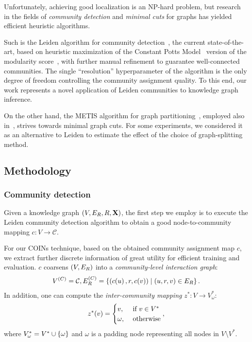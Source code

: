 Unfortunately, achieving good localization is an NP-hard problem, but research in the fields of \emph{community detection} and \emph{minimal cuts} for graphs has yielded efficient heuristic algorithms. 

Such is the Leiden algorithm for community detection~\cite{traag_louvain_2019}, the current state-of-the-art, based on heuristic maximization of the Constant Potts Model~\cite{traag_narrow_2011} version of the modularity score~\cite{blondel_fast_2008}, with further manual refinement to guarantee well-connected communities. The single \enquote{resolution} hyperparameter of the algorithm is the only degree of freedom controlling the community assignment quality. To this end, our work represents a novel application of Leiden communities to knowledge graph inference. 

On the other hand, the METIS algorithm for graph partitioning~\cite{karypis_fast_1998}, employed also in~\cite{zheng_dgl-ke_2020}, strives towards minimal graph cuts. For some experiments, we considered it as an alternative to Leiden to estimate the effect of the choice of graph-splitting method.

\subsection{Methodology}
\label{sec:methodology}

\subsubsection{Community detection}

Given a knowledge graph $\mathopen{}\left(V, E_R, R, \mathbf{X}\right)$, the first step we employ is to execute the Leiden community detection algorithm to obtain a good node-to-community mapping $c: V \to \mathcal{C}$. 

For our COINs technique, based on the obtained community assignment map $c$, we extract further discrete information of great utility for efficient training and evaluation. $c$ coarsens $\mathopen{}\left(V, E_R\right)$ into a \emph{community-level interaction graph}: 
\begin{equation}
V^{\mathopen{}\left(C\right)} = \mathcal{C}, E^{\mathopen{}\left(C\right)}_R = \mathopen{}\left\{\mathopen{}\left(c\mathopen{}\left(u\right),r,c\mathopen{}\left(v\right)\right) \mid \mathopen{}\left(u,r,v\right) \in E_R\right\}.    
\end{equation}
In addition, one can compute the \emph{inter-community mapping} $z^*: V \to V_{\omega}^*$:
\begin{equation}
    z^*\mathopen{}\left(v\right)=\begin{cases} v, & \text{ if } v \in V^* \\ \omega, & \text{ otherwise} \end{cases},
\end{equation}
where $V_{\omega}^* = V^* \cup \mathopen{}\left\{\omega\right\}$ and $\omega$ is a padding node representing all nodes in $V \setminus V^*$.

